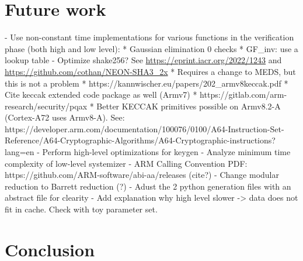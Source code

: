 \documentclass[11pt,a4paper]{report}
\theoremstyle{definition}
\begin{document}
\chapter{Future work}
\label{ch:futurework}
- Use non-constant time implementations for various functions in the verification phase (both high and low level):
  * Gaussian elimination 0 checks
  * GF\_inv: use a lookup table
- Optimize shake256? See \url{https://eprint.iacr.org/2022/1243} and \url{https://github.com/cothan/NEON-SHA3\_2x}
  * Requires a change to MEDS, but this is not a problem
  * https://kannwischer.eu/papers/202\_armv8keccak.pdf
  * Cite keccak extended code package as well (Armv7)
  * https://gitlab.com/arm-research/security/pqax
  * Better KECCAK primitives possible on Armv8.2-A (Cortex-A72 uses Armv8-A). See: https://developer.arm.com/documentation/100076/0100/A64-Instruction-Set-Reference/A64-Cryptographic-Algorithms/A64-Cryptographic-instructions?lang=en
- Perform high-level optimizations for keygen
- Analyze minimum time complexity of low-level systemizer
- ARM Calling Convention PDF: https://github.com/ARM-software/abi-aa/releases (cite?)
- Change modular reduction to Barrett reduction (?)
- Adust the 2 python generation files with an abstract file for clearity
- Add explanation why high level slower -> data does not fit in cache. Check with toy parameter set.

\chapter{Conclusion}
\label{ch:conclusion}





\end{document}
